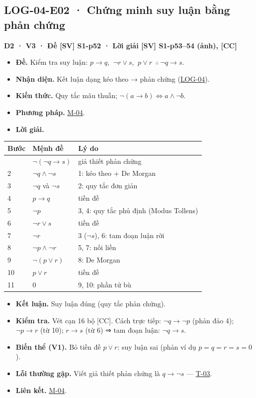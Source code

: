 \documentclass[
  10pt,
  twoside,openany]{book}
\providecommand{\tightlist}{%
  \setlength{\itemsep}{0pt}\setlength{\parskip}{0pt}}
\begin{document}
\hypertarget{LOG-04-E02}{%
\subsection{LOG-04-E02 · Chứng minh suy luận bằng phản
chứng}\label{LOG-04-E02}}

\textbf{D2 · V3 · Đề {[}SV{]} S1-p52 · Lời giải {[}SV{]} S1-p53--54
(ảnh), {[}CC{]}}

\begin{itemize}
\tightlist
\item
  \textbf{Đề.} Kiểm tra suy luận: \(p\to q\), \(\ \neg r\vee s\),
  \(\ p\vee r\ \ \therefore\ \neg q\to s\).
\item
  \textbf{Nhận diện.} Kết luận dạng kéo theo → phản chứng
  (\protect\hyperlink{LOG-04}{LOG-04}).
\item
  \textbf{Kiến thức.} Quy tắc mâu thuẫn;
  \(\neg(a\to b)\Leftrightarrow a\wedge\neg b\).
\item
  \textbf{Phương pháp.} \protect\hyperlink{M-04}{M-04}.
\item
  \textbf{Lời giải.}
\end{itemize}

\begin{longtable}[]{@{}lll@{}}
\toprule\noalign{}
Bước & Mệnh đề & Lý do \\
\midrule\noalign{}
\endhead
\bottomrule\noalign{}
\endlastfoot
1 & \(\neg(\neg q\to s)\) & giả thiết phản chứng \\
2 & \(\neg q\wedge\neg s\) & 1: kéo theo + De Morgan \\
3 & \(\neg q\) và \(\neg s\) & 2: quy tắc đơn giản \\
4 & \(p\to q\) & tiền đề \\
5 & \(\neg p\) & 3, 4: quy tắc phủ định (Modus Tollens) \\
6 & \(\neg r\vee s\) & tiền đề \\
7 & \(\neg r\) & 3 (\(\neg s\)), 6: tam đoạn luận rời \\
8 & \(\neg p\wedge\neg r\) & 5, 7: nối liền \\
9 & \(\neg(p\vee r)\) & 8: De Morgan \\
10 & \(p\vee r\) & tiền đề \\
11 & \(0\) & 9, 10: phần tử bù \\
\end{longtable}

\begin{itemize}
\tightlist
\item
  \textbf{Kết luận.} Suy luận đúng (quy tắc phản chứng).
\item
  \textbf{Kiểm tra.} Vét cạn 16 bộ {[}CC{]}. Cách trực tiếp:
  \(\neg q\to\neg p\) (phản đảo 4); \(\neg p\to r\) (từ 10); \(r\to s\)
  (từ 6) ⇒ tam đoạn luận: \(\neg q\to s\).
\item
  \textbf{Biến thể (V1).} Bỏ tiền đề \(p\vee r\): suy luận sai (phản ví
  dụ \(p=q=r=s=0\)).
\item
  \textbf{Lỗi thường gặp.} Viết giả thiết phản chứng là \(q\to\neg s\)
  --- \protect\hyperlink{T-03}{T-03}.
\item
  \textbf{Liên kết.} \protect\hyperlink{M-04}{M-04}.
\end{itemize}
\end{document}
